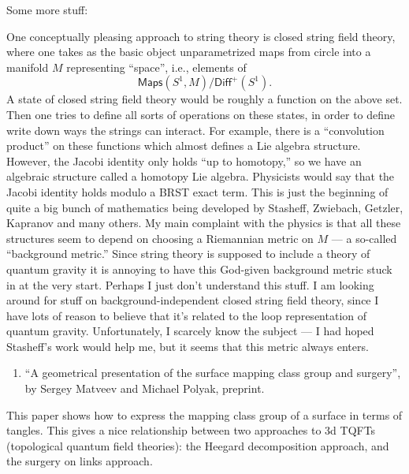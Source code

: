 \documentclass{article}
\def\tightlist{}
\renewcommand{\texttt}[1]{%
  \begingroup
  \ttfamily
  \begingroup\lccode`~=`/\lowercase{\endgroup\def~}{/\discretionary{}{}{}}%
  \begingroup\lccode`~=`[\lowercase{\endgroup\def~}{[\discretionary{}{}{}}%
  \begingroup\lccode`~=`.\lowercase{\endgroup\def~}{.\discretionary{}{}{}}%
  \catcode`/=\active\catcode`[=\active\catcode`.=\active
  \scantokens{#1\noexpand}%
  \endgroup
}
\begin{document}
Some more stuff:


One conceptually pleasing approach to string theory is closed string
field theory, where one takes as the basic object unparametrized maps
from circle into a manifold \(M\) representing ``space'', i.e., elements
of \[\mathsf{Maps}(S^1,M)/\mathsf{Diff}^+(S^1).\] A state of closed
string field theory would be roughly a function on the above set. Then
one tries to define all sorts of operations on these states, in order to
define write down ways the strings can interact. For example, there is a
``convolution product'' on these functions which almost defines a Lie
algebra structure. However, the Jacobi identity only holds ``up to
homotopy,'' so we have an algebraic structure called a homotopy Lie
algebra. Physicists would say that the Jacobi identity holds modulo a
BRST exact term. This is just the beginning of quite a big bunch of
mathematics being developed by Stasheff, Zwiebach, Getzler, Kapranov and
many others. My main complaint with the physics is that all these
structures seem to depend on choosing a Riemannian metric on \(M\) --- a
so-called ``background metric.'' Since string theory is supposed to
include a theory of quantum gravity it is annoying to have this
God-given background metric stuck in at the very start. Perhaps I just
don't understand this stuff. I am looking around for stuff on
background-independent closed string field theory, since I have lots of
reason to believe that it's related to the loop representation of
quantum gravity. Unfortunately, I scarcely know the subject --- I had
hoped Stasheff's work would help me, but it seems that this metric
always enters.

\begin{enumerate}
\def\labelenumi{\arabic{enumi})}
\setcounter{enumi}{4}
\tightlist
\item
  ``A geometrical presentation of the surface mapping class group and
  surgery'', by Sergey Matveev and Michael Polyak, preprint.
\end{enumerate}

This paper shows how to express the mapping class group of a surface in
terms of tangles. This gives a nice relationship between two approaches
to 3d TQFTs (topological quantum field theories): the Heegard
decomposition approach, and the surgery on links approach.
\end{document}
